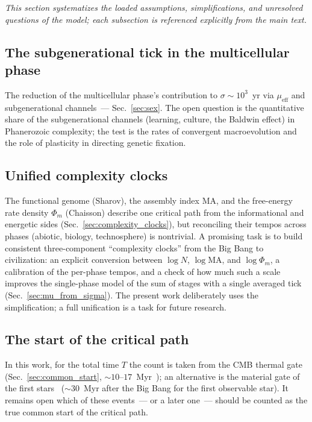 \documentclass[11pt,a4paper]{article}
\begin{document}
\textit{This section systematizes the loaded assumptions, simplifications, and unresolved questions of the model; each subsection is referenced explicitly from the main text.}

\subsection{The subgenerational tick in the multicellular phase}
\label{sec:macro_tempo}

The reduction of the multicellular phase's contribution to $\sigma \sim 10^3$~yr via $\mu_{\mathrm{eff}}$ and subgenerational channels~--- Sec.~\ref{sec:sex}. The open question is the quantitative share of the subgenerational channels (learning, culture, the Baldwin effect) in Phanerozoic complexity; the test is the rates of convergent macroevolution and the role of plasticity in directing genetic fixation.

\subsection{Unified complexity clocks}
\label{sec:unified_clocks}

The functional genome (Sharov), the assembly index MA, and the free-energy rate density $\Phi_m$ (Chaisson) describe one critical path from the informational and energetic sides (Sec.~\ref{sec:complexity_clocks}), but reconciling their tempos across phases (abiotic, biology, technosphere) is nontrivial. A promising task is to build consistent three-component ``complexity clocks'' from the Big Bang to civilization: an explicit conversion between $\log N$, $\log \mathrm{MA}$, and $\log \Phi_m$, a calibration of the per-phase tempos, and a check of how much such a scale improves the single-phase model of the sum of stages with a single averaged tick (Sec.~\ref{sec:mu_from_sigma}). The present work deliberately uses the simplification; a full unification is a task for future research.

\subsection{The start of the critical path}
\label{sec:open_start}

In this work, for the total time $T$ the count is taken from the CMB thermal gate (Sec.~\ref{sec:common_start}, $\sim 10$--$17$~Myr~\cite{Loeb2014}); an alternative is the material gate of the first stars~\cite{Naoz2006} ($\sim 30$~Myr after the Big Bang for the first observable star). It remains open which of these events~--- or a later one~--- should be counted as the true common start of the critical path.
\end{document}
